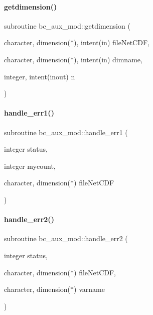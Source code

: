 \paragraph{\texorpdfstring{getdimension()}{getdimension()}}
{\footnotesize\ttfamily subroutine bc\+\_\+aux\+\_\+mod\+::getdimension (\begin{DoxyParamCaption}\item[{character, dimension($\ast$), intent(in)}]{file\+Net\+C\+DF,  }\item[{character, dimension($\ast$), intent(in)}]{dimname,  }\item[{integer, intent(inout)}]{n }\end{DoxyParamCaption})}

\mbox{\label{namespacebc__aux__mod_a777b6d03acb56d99a3cc8787363990cc}} 
\paragraph{\texorpdfstring{handle\+\_\+err1()}{handle\_err1()}}
{\footnotesize\ttfamily subroutine bc\+\_\+aux\+\_\+mod\+::handle\+\_\+err1 (\begin{DoxyParamCaption}\item[{integer}]{status,  }\item[{integer}]{mycount,  }\item[{character, dimension($\ast$)}]{file\+Net\+C\+DF }\end{DoxyParamCaption})}

\mbox{\label{namespacebc__aux__mod_a921a799abc5965966b4b8b3abf38f762}} 
\paragraph{\texorpdfstring{handle\+\_\+err2()}{handle\_err2()}}
{\footnotesize\ttfamily subroutine bc\+\_\+aux\+\_\+mod\+::handle\+\_\+err2 (\begin{DoxyParamCaption}\item[{integer}]{status,  }\item[{character, dimension($\ast$)}]{file\+Net\+C\+DF,  }\item[{character, dimension($\ast$)}]{varname }\end{DoxyParamCaption})}

